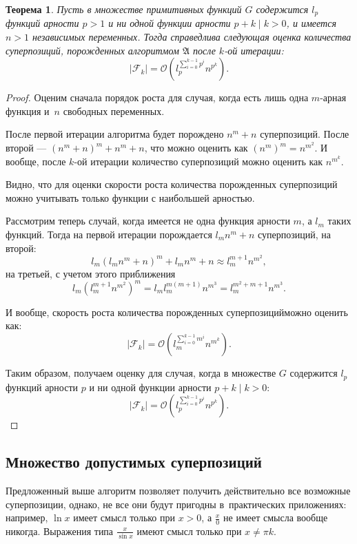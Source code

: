 \documentclass[12pt,a4paper]{amsart}
\newtheorem{theorem}{Теорема}
\begin{document}
\begin{theorem}
  Пусть в множестве примитивных функций $G$ содержится $l_p$ функций арности
  $p > 1$ и ни одной функции арности $p + k \mid k > 0$, и имеется $n > 1$
  независимых переменных. Тогда справедлива следующая оценка количества
  суперпозиций, порожденных алгоритмом $\mathfrak{A}$ после $k$-ой итерации:
  \[
  | \mathcal{F}_k | = \mathcal{O} (l_p^{\sum_{i=0}^{k-1} p^i} n^{p^k}).
  \]
\end{theorem}
\begin{proof}
  Оценим сначала порядок роста для случая, когда есть лишь одна $m$-арная
  функция и~$n$ свободных переменных.

  После первой итерации алгоритма будет порождено $n^m + n$ суперпозиций.
  После второй --- $(n^m + n)^m + n^m + n$, что можно оценить как 
  $(n^m)^m = n^{m^2}$. И вообще, после $k$-ой итерации количество
  суперпозиций можно оценить как $n^{m^k}$.

  Видно, что для оценки скорости роста количества порожденных суперпозиций
  можно учитывать только функции с наибольшей арностью.

  Рассмотрим теперь случай, когда имеется не одна функция арности $m$, а
  $l_m$ таких функций. Тогда на первой итерации порождается $l_m n^m + n$
  суперпозиций, на второй:
  \[
  l_m (l_m n^m + n)^m + l_m n^m + n \approx l_m^{m+1} n^{m^2},
  \]
  на третьей, с учетом этого приближения
  \[
  l_m (l_m^{m+1} n^{m^2})^m = l_m l_m^{m(m+1)} n^{m^3} = l_m^{m^2 + m + 1} n^{m^3}.
  \]

  И вообще, скорость роста количества порожденных суперпозицийможно оценить
  как:
  \[
  | \mathcal{F}_k | = \mathcal{O} (l_m^{\sum_{i=0}^{k-1} m^i} n^{m^k}).
  \]

  Таким образом, получаем оценку для случая, когда в множестве $G$ содержится
  $l_p$ функций арности $p$ и ни одной функции арности $p + k \mid k > 0$:
  \[
  | \mathcal{F}_k | = \mathcal{O} (l_p^{\sum_{i=0}^{k-1} p^i} n^{p^k}).
  \]
\end{proof}

\subsection{Множество допустимых суперпозиций}

Предложенный выше алгоритм позволяет получить действительно все возможные
суперпозиции, однако, не все они будут пригодны в~практических приложениях:
например, $\ln x$ имеет смысл только при $x > 0$, а $\frac{x}{0}$ не имеет
смысла вообще никогда. Выражения типа $\frac{x}{\sin x}$ имеют смысл только
при $x \neq \pi k$.
\end{document}
